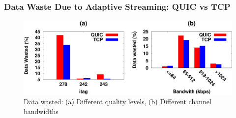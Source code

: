 \subsubsection{Data Waste Due to Adaptive Streaming: QUIC vs TCP}

\begin{figure}[!t]
	\captionsetup[subfigure]{}
	\begin{center}
        \includegraphics[width=0.9\linewidth]{img/plotdata/CDF/downloaded/data_wasted_itag_bw}
		\caption{\label{fig:data_wasted}Data wasted: (a) Different quality levels, (b) Different channel bandwidths}
	\end{center}
\end{figure}



%

